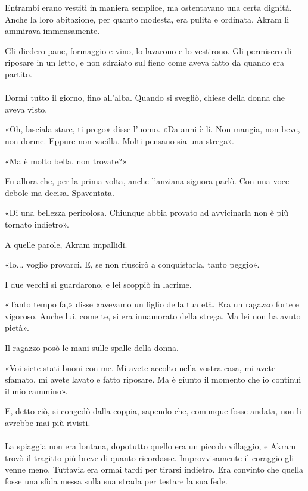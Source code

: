 \documentclass[a4paper,12pt]{book}
\begin{document}
Entrambi erano vestiti in maniera semplice, ma ostentavano una certa dignità.
Anche la loro abitazione, per quanto modesta, era pulita e ordinata. Akram li
ammirava immensamente.

Gli diedero pane, formaggio e vino, lo lavarono e lo vestirono. Gli permisero di
riposare in un letto, e non sdraiato sul fieno come aveva fatto da quando era
partito.

\paragraph{}
Dormì tutto il giorno, fino all'alba. Quando si svegliò, chiese della donna
che aveva visto.

«Oh, lasciala stare, ti prego» disse l'uomo. «Da anni è lì. Non mangia, non
beve, non dorme. Eppure non vacilla. Molti pensano sia una strega».

«Ma è molto bella, non trovate?»

Fu allora che, per la prima volta, anche l'anziana signora parlò. Con una voce
debole ma decisa. Spaventata.

«Di una bellezza pericolosa. Chiunque abbia provato ad avvicinarla non è più
tornato indietro».

A quelle parole, Akram impallidì.

«Io... voglio provarci. E, se non riuscirò a conquistarla, tanto peggio».

I due vecchi si guardarono, e lei scoppiò in lacrime.

«Tanto tempo fa,» disse «avevamo un figlio della tua età. Era un ragazzo
forte e vigoroso. Anche lui, come te, si era innamorato della strega. Ma lei non
ha avuto pietà».

Il ragazzo posò le mani sulle spalle della donna.

«Voi siete stati buoni con me. Mi avete accolto nella vostra casa, mi avete
sfamato, mi avete lavato e fatto riposare. Ma è giunto il momento che io
continui il mio cammino».

E, detto ciò, si congedò dalla coppia, sapendo che, comunque fosse andata, non
li avrebbe mai più rivisti.

\paragraph{}
La spiaggia non era lontana, dopotutto quello era un piccolo villaggio, e Akram
trovò il tragitto più breve di quanto ricordasse. Improvvisamente il coraggio
gli venne meno. Tuttavia era ormai tardi per tirarsi indietro. Era convinto che
quella fosse una sfida messa sulla sua strada per testare la sua fede.
\end{document}
